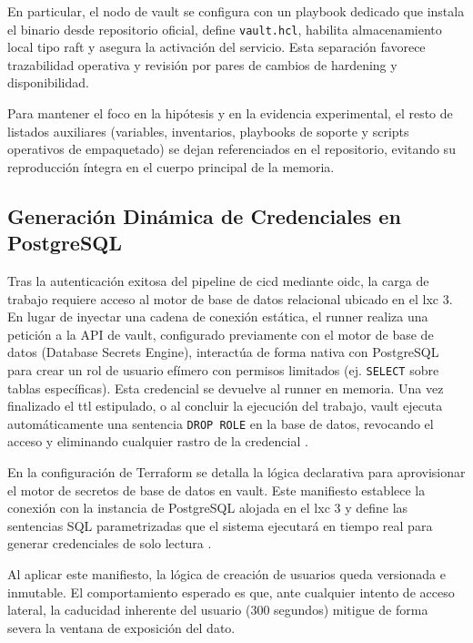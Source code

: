 \documentclass[runningheads]{llncs}
\begin{document}
En particular, el nodo de \gls{vault} se configura con un playbook dedicado que instala el binario desde repositorio oficial, define \texttt{vault.hcl}, habilita almacenamiento local tipo \gls{raft} y asegura la activación del servicio. Esta separación favorece trazabilidad operativa y revisión por pares de cambios de hardening y disponibilidad.

Para mantener el foco en la hipótesis y en la evidencia experimental, el resto de listados auxiliares (variables, inventarios, playbooks de soporte y scripts operativos de empaquetado) se dejan referenciados en el repositorio, evitando su reproducción íntegra en el cuerpo principal de la memoria.

\subsection*{Generación Dinámica de Credenciales en PostgreSQL}
Tras la autenticación exitosa del pipeline de \gls{cicd} mediante \gls{oidc}, la carga de trabajo requiere acceso al motor de base de datos relacional ubicado en el \gls{lxc} 3. En lugar de inyectar una cadena de conexión estática, el runner realiza una petición a la API de \gls{vault}, configurado previamente con el motor de base de datos (Database Secrets Engine), interactúa de forma nativa con PostgreSQL para crear un rol de usuario efímero con permisos limitados (ej. \texttt{SELECT} sobre tablas específicas). Esta credencial se devuelve al runner en memoria. Una vez finalizado el \gls{ttl} estipulado, o al concluir la ejecución del trabajo, \gls{vault} ejecuta automáticamente una sentencia \texttt{DROP ROLE} en la base de datos, revocando el acceso y eliminando cualquier rastro de la credencial \parencite{vault_database_secrets_engine}.

En la configuración de Terraform se detalla la lógica declarativa para aprovisionar el motor de secretos de base de datos en \gls{vault}. Este manifiesto establece la conexión con la instancia de PostgreSQL alojada en el \gls{lxc} 3 y define las sentencias SQL parametrizadas que el sistema ejecutará en tiempo real para generar credenciales de solo lectura \parencite{terraform_documentation,vault_database_secrets_engine}.

% 

Al aplicar este manifiesto, la lógica de creación de usuarios queda versionada e inmutable. El comportamiento esperado es que, ante cualquier intento de acceso lateral, la caducidad inherente del usuario (300 segundos) mitigue de forma severa la ventana de exposición del dato.
\end{document}
